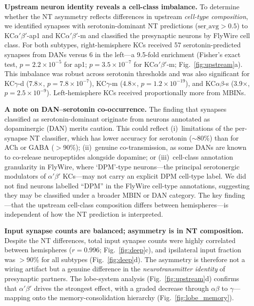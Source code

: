 \documentclass[10pt]{article}
\begin{document}
\textbf{Upstream neuron identity reveals a cell-class imbalance.} To determine whether the NT asymmetry reflects differences in upstream \textit{cell-type composition}, we identified synapses with serotonin-dominant NT predictions ($\mathrm{ser\_avg} > 0.5$) to KC$\alpha'\beta'$-ap1 and KC$\alpha'\beta'$-m and classified the presynaptic neurons by FlyWire cell class. For both subtypes, right-hemisphere KCs received 57 serotonin-predicted synapses from DANs versus 6 in the left---a 9.5-fold enrichment (Fisher's exact test, $p = 2.2 \times 10^{-5}$ for ap1; $p = 3.5 \times 10^{-7}$ for KC$\alpha'\beta'$-m; Fig.~\ref{fig:upstream}a). This imbalance was robust across serotonin thresholds and was also significant for KC$\gamma$-d (7.8$\times$, $p = 7.8 \times 10^{-7}$), KC$\gamma$-m (4.8$\times$, $p = 1.2 \times 10^{-19}$), and KC$\alpha\beta$-s (3.9$\times$, $p = 2.5 \times 10^{-9}$). Left-hemisphere KCs received proportionally more from MBINs.

\textbf{A note on DAN--serotonin co-occurrence.} The finding that synapses classified as serotonin-dominant originate from neurons annotated as dopaminergic (DAN) merits caution. This could reflect (i)~limitations of the per-synapse NT classifier, which has lower accuracy for serotonin ($\sim$80\%) than for ACh or GABA ($>$90\%)\cite{eckstein2020neurotransmitter}; (ii)~genuine co-transmission, as some DANs are known to co-release neuropeptides alongside dopamine; or (iii)~cell-class annotation granularity in FlyWire, where `DPM'-type neurons---the principal serotonergic modulators of $\alpha'\beta'$ KCs\cite{keene2006dpm}---may not carry an explicit DPM cell-type label. We did not find neurons labelled ``DPM'' in the FlyWire cell-type annotations, suggesting they may be classified under a broader MBIN or DAN category. The key finding---that the upstream cell-class composition differs between hemispheres---is independent of how the NT prediction is interpreted.

\textbf{Input synapse counts are balanced; asymmetry is in NT composition.} Despite the NT differences, total input synapse counts were highly correlated between hemispheres ($r = 0.996$; Fig.~\ref{fig:deep}c), and ipsilateral input fraction was $>$90\% for all subtypes (Fig.~\ref{fig:deep}d). The asymmetry is therefore not a wiring artifact but a genuine difference in the \textit{neurotransmitter identity} of presynaptic partners. The lobe-system analysis (Fig.~\ref{fig:upstream}d) confirms that $\alpha'\beta'$ drives the strongest effect, with a graded decrease through $\alpha\beta$ to $\gamma$---mapping onto the memory-consolidation hierarchy (Fig.~\ref{fig:lobe_memory}).
\end{document}
